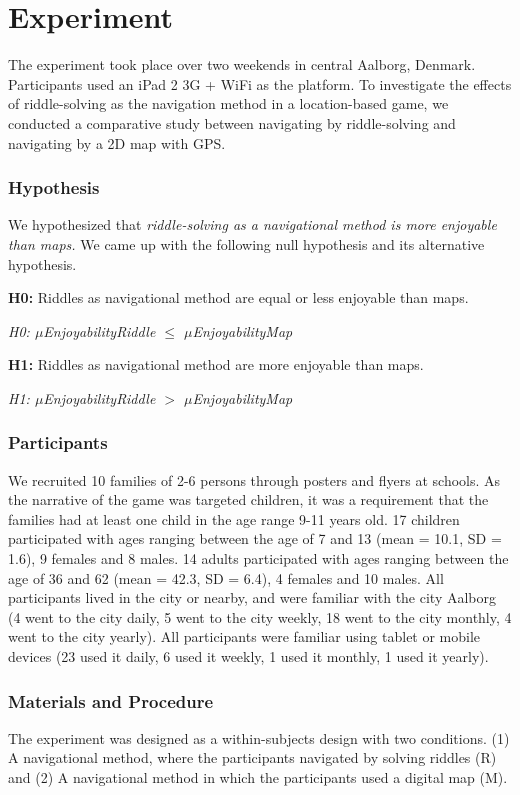 \section{Experiment}
The experiment took place over two weekends in central Aalborg, Denmark. Participants used an iPad 2 3G + WiFi as the platform. To investigate the effects of riddle-solving as the navigation method in a location-based game, we conducted a comparative study between navigating by riddle-solving and navigating by a 2D map with GPS. 

\subsubsection{Hypothesis}
We hypothesized that \textit{riddle-solving as a navigational method is more enjoyable than maps.} We came up with the following null hypothesis and its alternative hypothesis. 

\textbf{H0:} Riddles as navigational method are equal or less enjoyable than maps. 

\hspace{10 mm} \textit{H0: $\mu$EnjoyabilityRiddle $\leq$ $\mu$EnjoyabilityMap}

\textbf{H1:} Riddles as navigational method are more enjoyable than maps.

\hspace{10 mm} \textit{H1: $\mu$EnjoyabilityRiddle $>$ $\mu$EnjoyabilityMap}

\subsubsection{Participants}
We recruited 10 families of 2-6 persons through posters and flyers at schools. 
As the narrative of the game was targeted children, it was a requirement that the families had at least one child in the age range 9-11 years old. 17 children participated with ages ranging between the age of 7 and 13 (mean = 10.1, SD = 1.6), 9 females and 8 males. 14 adults participated with ages ranging between the age of 36 and 62 (mean = 42.3, SD = 6.4), 4 females and 10 males.  All participants lived in the city or nearby, and were familiar with the city Aalborg (4 went to the city daily, 5 went to the city weekly, 18 went to the city monthly, 4 went to the city yearly). All participants were familiar using tablet or mobile devices (23 used it daily, 6 used it weekly, 1 used it monthly, 1 used it yearly).

\subsubsection{Materials and Procedure}
The experiment was designed as a within-subjects design with two conditions. (1) A navigational method, where the participants navigated by solving riddles (R) and (2) A navigational method in which the participants used a digital map (M).

